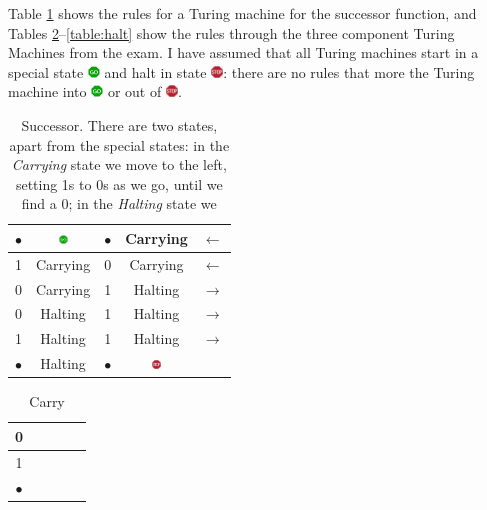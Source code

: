 \documentclass[]{article}
\begin{document}
Table \ref{table:successor} shows the rules for a Turing machine for the successor function, and Tables  \ref{table:carry}--\ref{table:halt} show the rules through the three component Turing Machines from the exam. I have assumed that all Turing machines start in a special state \includegraphics[width=9pt]{gosign} and halt in state \includegraphics[width=9pt]{stop}: there are no rules that more the Turing machine into \includegraphics[width=9pt]{gosign} or out of \includegraphics[width=9pt]{stop}.
\begin{table}[H]
	\begin{center}
		\caption{Successor. There are two states, apart from the special states: in the \emph{Carrying} state we move to the left, setting 1s to 0s as we go, until we find a 0; in the \emph{Halting} state we }\label{table:successor}
		\begin{tabular}{|c|c||c|c|c|} \hline
			$\bullet$ &\includegraphics[width=9pt,height=7pt]{gosign}&$\bullet$ &Carrying&$\leftarrow$ \\ \hline
			1&Carrying&0&Carrying&$\leftarrow$ \\ \hline
			0&Carrying&1&Halting&$\rightarrow$ \\ \hline
			0&Halting&1&Halting&$\rightarrow$ \\ \hline
			1&Halting&1&Halting&$\rightarrow$ \\ \hline
			$\bullet$ &Halting&	$\bullet$&\includegraphics[width=9pt,height=7pt]{stop}& \\ \hline
		\end{tabular}
	\end{center}
\end{table}


\begin{table}[H]
	\begin{center}
		\caption{Carry}\label{table:carry}
		\begin{tabular}{|c|c||c|c|c|} \hline
			0&&&& \\ \hline
			1&&&& \\ \hline
			$\bullet$ &&&& \\ \hline
		\end{tabular}
	\end{center}
\end{table}
\end{document}
